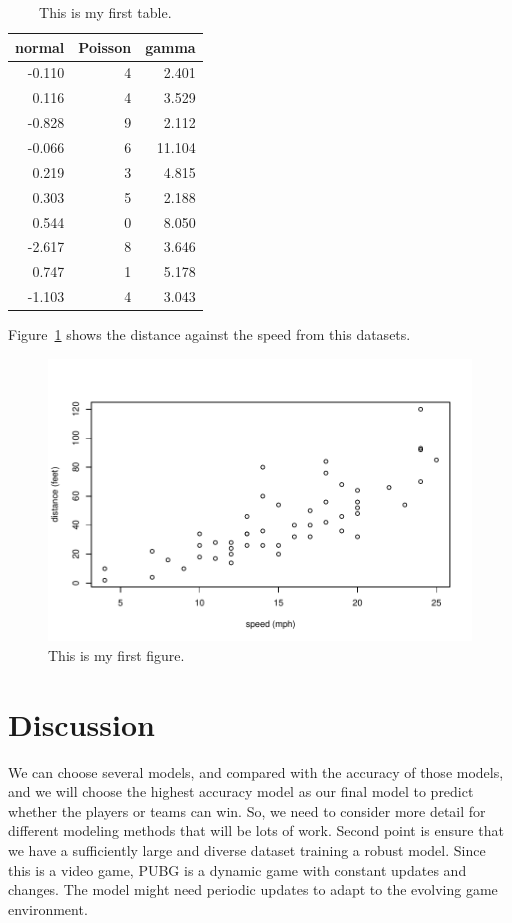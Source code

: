 \documentclass[12pt]{article}
\begin{document}
\begin{table}[tbp]
  \caption{This is my first table.}
  \label{tab:rv}
\centering
\begin{tabular}{rrr}
  \toprule
normal & Poisson & gamma \\ 
  \midrule
-0.110 & 4 & 2.401 \\ 
  0.116 & 4 & 3.529 \\ 
  -0.828 & 9 & 2.112 \\ 
  -0.066 & 6 & 11.104 \\ 
  0.219 & 3 & 4.815 \\ 
  0.303 & 5 & 2.188 \\ 
  0.544 & 0 & 8.050 \\ 
  -2.617 & 8 & 3.646 \\ 
  0.747 & 1 & 5.178 \\ 
  -1.103 & 4 & 3.043 \\ 
   \bottomrule
\end{tabular}
\end{table}

Figure~\ref{fig:cars} shows the distance against the speed from this datasets.


\begin{figure}[tbp]
  \centering
  \includegraphics[width=\textwidth]{cars.pdf}
  \caption{This is my first figure.}
  \label{fig:cars}
\end{figure}

\section{Discussion}
\label{sec:disc}

We can choose several models, and compared with the accuracy of those models, and we will choose the highest accuracy model as our final model to predict whether the players or teams can win. So, we need to consider more detail for different modeling methods that will be lots of work.
Second point is ensure that we have a sufficiently large and diverse dataset training a robust model.
Since this is a video game, PUBG is a dynamic game with constant updates and changes. The model might need periodic updates to adapt to the evolving game environment.
\end{document}
